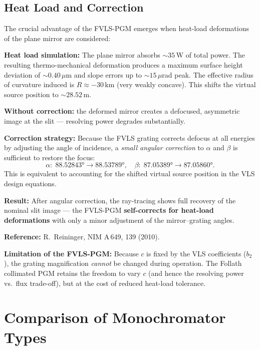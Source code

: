\documentclass[12pt,a4paper]{article}
\newcommand{\al}{\alpha}
\newcommand{\be}{\beta}
\begin{document}
\subsection{Heat Load and Correction}

The crucial advantage of the FVLS-PGM emerges when heat-load deformations of the plane
mirror are considered:

\begin{exbox}
\textbf{Heat load simulation:} The plane mirror absorbs $\sim 35$\,W of total power.
The resulting thermo-mechanical deformation produces a maximum surface height deviation of
$\sim 0.40\,\mu$m and slope errors up to $\sim 15\,\mu$rad peak.  The effective radius of
curvature induced is $R \approx -30\,\mathrm{km}$ (very weakly concave).  This shifts the
virtual source position to $\sim 28.52$\,m.

\medskip
\textbf{Without correction:} the deformed mirror creates a defocused, asymmetric image at
the slit --- resolving power degrades substantially.

\medskip
\textbf{Correction strategy:} Because the FVLS grating corrects defocus at all energies
by adjusting the angle of incidence, a \emph{small angular correction} to $\al$ and $\be$
is sufficient to restore the focus:
\[
  \al:\; 88.52843° \to 88.53789°,\quad
  \be:\; 87.05389° \to 87.05860°.
\]
This is equivalent to accounting for the shifted virtual source position in the VLS design
equations.

\medskip
\textbf{Result:} After angular correction, the ray-tracing shows full recovery of the
nominal slit image --- the FVLS-PGM \textbf{self-corrects for heat-load deformations}
with only a minor adjustment of the mirror--grating angles.

\medskip
\textbf{Reference:} R.\ Reininger, NIM A\,649, 139 (2010).
\end{exbox}

\begin{notebox}
\textbf{Limitation of the FVLS-PGM:} Because $c$ is fixed by the VLS coefficients
($b_2$), the grating magnification \emph{cannot} be changed during operation.  The Follath
collimated PGM retains the freedom to vary $c$ (and hence the resolving power vs.\ flux
trade-off), but at the cost of reduced heat-load tolerance.
\end{notebox}

\section{Comparison of Monochromator Types}
\end{document}
